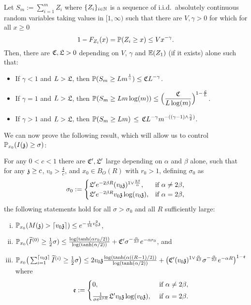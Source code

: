 \begin{lemma}\label{lem:cotapower}
Let $S_m:=\sum_{i=1}^m Z_i$ where $\{Z_i\}_{i\in\NN}$  is a sequence of i.i.d.~absolutely continuous random variables taking values in $[1,\infty)$ such that there are $V,\gamma>0$ for which for all $x\geq 0$
\[1-F_{Z_i}(x)=\PP(Z_i\geq x)\leq Vx^{-\gamma}.\]
Then, there are $\auxc,\auxl>0$ depending on $V$, $\gamma$ and $\EE(Z_1)$  (if it exists) alone such that:
\begin{itemize}
    \item If $\gamma<1$ and $L>\auxl$, then
    $\displaystyle\PP(S_m\geq Lm^{\frac{1}{\gamma}})\leq \auxc L^{-\gamma}$.
    \item If $\gamma=1$ and $L>\auxl$, then $\displaystyle\PP(S_m\geq Lm\log(m))\leq \Big(\frac{\auxc}{L\log(m)}\Big)^{1-\frac{\auxl}{L}}$.
    \item If $\gamma>1$ and  $L>\auxl$, then
    $\displaystyle\PP(S_m\geq Lm)\,\leq\,\auxc L^{-\gamma}m^{-((\gamma-1)\wedge\frac{\gamma}{2})}$.
\end{itemize}
\end{lemma}
We can now prove the following result, which will allow us to control $\PP_{x_0}(\II{\ss}\ge\sigma)$:
\begin{proposition}\label{prop:merged-varianza}
For any $0<c<1$ there are $\auxc',\auxl'$ large depending on $\alpha$ and $\beta$ alone, such that for any $\ss\geq c$, $v_0>\frac{4}{c}$, and $x_0\in B_O(R)$ with $r_0>1$, defining $\sigma_0$ as
\[
\sigma_0 := \begin{cases}
\auxl'e^{-2\beta R}(v_0\ss)^{1\vee\frac{2\beta}{\alpha}}, &
\text{if $\alpha \neq 2\beta$,} \\
\auxl'e^{-2\beta R}v_0\ss\log(v_0\ss), &
\text{if $\alpha=2\beta$,}
\end{cases}
\]
the following statements hold for all $\sigma>\sigma_0$ and all $R$ sufficiently large:
\begin{enumerate}[(i)]
\item\label{prop:merged-varianza:itm1} $\PP_{x_0}(M(\ss)>\lceil v_0\ss\rceil )\leq e^{-\frac{1}{16} v_0^2\ss}$,
\item\label{prop:merged-varianza:itm2} $\PP_{x_0}(\tI^{(0)}\geq\tfrac12\sigma)\leq \frac{\log(\tanh(\alpha r_0/2))}{\log(\tanh(\alpha/2))}+\auxc'\sigma^{-\frac{\alpha}{2\beta}} e^{-\alpha r_0}$, and 
\item\label{prop:merged-varianza:itm3} $\PP_{x_0}\big(\sum_{i=1}^{\lceil v_0\ss\rceil}\tI^{(i)}\geq\tfrac12\sigma\big)\leq 2v_0\ss\frac{\log(\tanh(\alpha ((R-1)/2))}{\log(\tanh(\alpha/2))}+\big(\auxc'(v_0\ss)^{1\vee\frac{\alpha}{4\beta}}\sigma^{-\frac{\alpha}{2\beta}}e^{-\alpha R}\big)^{1-\mathfrak{e}}$
where
\[\mathfrak{e}:=\begin{cases}
0, &\mbox{ if }\alpha\neq 2\beta, \\[3pt]\frac{1}{\sigma e^{2\beta R}}\auxl'v_0\ss\log(v_0\ss), &\mbox{ if }\alpha=2\beta.
\end{cases}\]
\end{enumerate}
\end{proposition}
